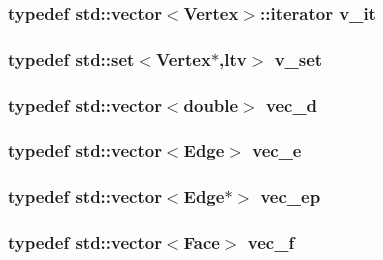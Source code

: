 \subsubsection{\setlength{\rightskip}{0pt plus 5cm}typedef std::vector$<${\bf Vertex}$>$::iterator {\bf v\_\-it}}\label{meshmorph_8h_3263d78f676958dea30d353e47e8b889}


\subsubsection{\setlength{\rightskip}{0pt plus 5cm}typedef std::set$<${\bf Vertex}$\ast$,{\bf ltv}$>$ {\bf v\_\-set}}\label{meshmorph_8h_f53009c47e4e310b71887703aee4ec17}


\subsubsection{\setlength{\rightskip}{0pt plus 5cm}typedef std::vector$<$double$>$ {\bf vec\_\-d}}\label{meshmorph_8h_db0ab3db1ab685e2d2bff657e3e86861}


\subsubsection{\setlength{\rightskip}{0pt plus 5cm}typedef std::vector$<${\bf Edge}$>$ {\bf vec\_\-e}}\label{meshmorph_8h_5b6feb140ea91636244ca71bf02ab5ea}


\subsubsection{\setlength{\rightskip}{0pt plus 5cm}typedef std::vector$<${\bf Edge}$\ast$$>$ {\bf vec\_\-ep}}\label{meshmorph_8h_b8f23ead30535aec0b94acd8c2b32c14}


\subsubsection{\setlength{\rightskip}{0pt plus 5cm}typedef std::vector$<${\bf Face}$>$ {\bf vec\_\-f}}\label{meshmorph_8h_a709e9ef45455fbf9881b8b6e2f0f5eb}


